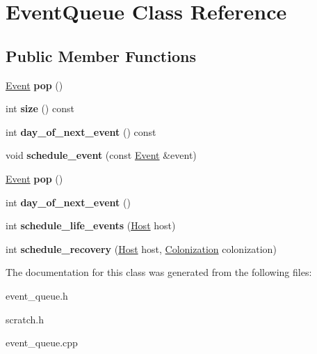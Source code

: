 \hypertarget{class_event_queue}{}\section{Event\+Queue Class Reference}
\label{class_event_queue}
\subsection*{Public Member Functions}
\begin{DoxyCompactItemize}
\item 
\mbox{\label{class_event_queue_a8ba6f20202101bdaf49e11845c454bfd}} 
\hyperlink{class_event}{Event} {\bfseries pop} ()
\item 
\mbox{\label{class_event_queue_a9f619e234f0cd71a655ed1447846f464}} 
int {\bfseries size} () const
\item 
\mbox{\label{class_event_queue_af84f8ed0d50496b8b8516c7ec81586e7}} 
int {\bfseries day\+\_\+of\+\_\+next\+\_\+event} () const
\item 
\mbox{\label{class_event_queue_a5deeca8e4f22348d146ad9e5c53478bf}} 
void {\bfseries schedule\+\_\+event} (const \hyperlink{class_event}{Event} \&event)
\item 
\mbox{\label{class_event_queue_a8ba6f20202101bdaf49e11845c454bfd}} 
\hyperlink{class_event}{Event} {\bfseries pop} ()
\item 
\mbox{\label{class_event_queue_a9b847dd27f59b2000ce8b0219cccfc08}} 
int {\bfseries day\+\_\+of\+\_\+next\+\_\+event} ()
\item 
\mbox{\label{class_event_queue_ae3053be03e55a973900f06a20d84dc63}} 
int {\bfseries schedule\+\_\+life\+\_\+events} (\hyperlink{class_host}{Host} host)
\item 
\mbox{\label{class_event_queue_a0e1b67148851cba79b044855f3112c1e}} 
int {\bfseries schedule\+\_\+recovery} (\hyperlink{class_host}{Host} host, \hyperlink{class_colonization}{Colonization} colonization)
\end{DoxyCompactItemize}


The documentation for this class was generated from the following files\+:\begin{DoxyCompactItemize}
\item 
event\+\_\+queue.\+h\item 
scratch.\+h\item 
event\+\_\+queue.\+cpp\end{DoxyCompactItemize}
